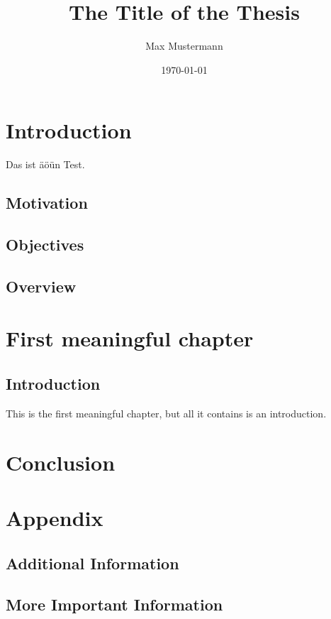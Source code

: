 \documentclass[ms, english]{stthesis}
\title{The Title of the Thesis}
\author{Max Mustermann}
\date{\today}
\begin{document}
  \maketitle %
  
  \tableofcontents
  
  \chapter{Introduction}
    Das ist äöün Test.
  	\section{Motivation}
  	\lipsum
  	
  	\section{Objectives}
  	\lipsum[1-3]
  	
  	\section{Overview}
	\lipsum[1]
    
  \chapter{First meaningful chapter}
  
     \section{Introduction}
       This is the first meaningful chapter, but all it contains is an introduction.

  \chapter{Conclusion}
  	\lipsum[1]

  \backmatter
  
  \appendix
  \chapter{Appendix}
  \section{Additional Information}
  \lipsum[1]
  
  \section{More Important Information}
  \lipsum[1]
  
\end{document}
